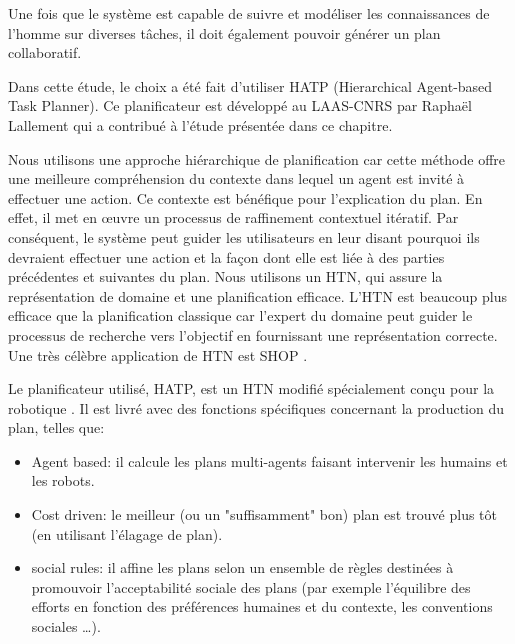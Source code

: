 \documentclass[a4paper,11pt,twoside]{StyleThese}
\begin{document}


Une fois que le système est capable de suivre et modéliser les connaissances de l'homme sur diverses tâches, il doit également pouvoir générer un plan collaboratif.

Dans cette étude, le choix a été fait d'utiliser HATP (Hierarchical Agent-based Task Planner). Ce planificateur est développé au LAAS-CNRS par Raphaël Lallement qui a contribué à l'étude présentée dans ce chapitre.

Nous utilisons une approche hiérarchique de planification car cette méthode offre une meilleure compréhension du contexte dans lequel un agent est invité à effectuer une action. Ce contexte est bénéfique pour l'explication du plan. En effet, il met en œuvre un processus de raffinement contextuel itératif. Par conséquent, le système peut guider les utilisateurs en leur disant pourquoi ils devraient effectuer une action et la façon dont elle est liée à des parties précédentes et suivantes du plan.
Nous utilisons un HTN, qui assure la représentation de domaine et une planification efficace.
L'HTN est beaucoup plus efficace que la planification classique car l'expert du domaine peut guider le processus de recherche vers l'objectif en fournissant une représentation correcte.
Une très célèbre application de HTN est SHOP \cite{Nau99}.

Le planificateur utilisé, HATP, est un HTN modifié spécialement conçu pour la robotique \cite{lallement14}.
Il est livré avec des fonctions spécifiques concernant la production du plan, telles que:

\begin{itemize}
\item Agent based: il calcule les plans multi-agents faisant intervenir les humains et les robots.
\item Cost driven: le meilleur (ou un "suffisamment" bon) plan est trouvé plus tôt (en utilisant l'élagage de plan).
\item social rules: il affine les plans selon un ensemble de règles destinées à promouvoir l'acceptabilité sociale des plans (par exemple l'équilibre des efforts  en fonction des préférences humaines et du contexte, les conventions sociales \ldots).
\end{itemize}
\end{document}
